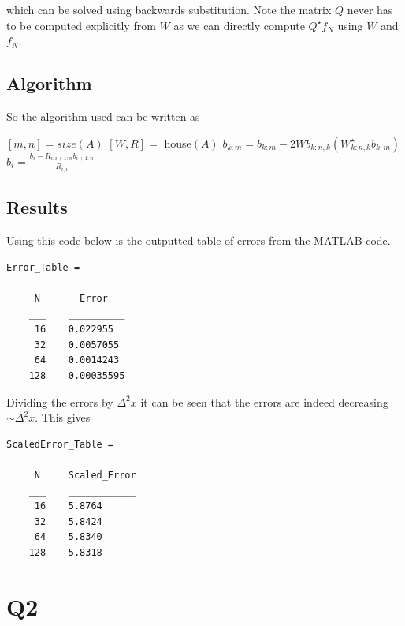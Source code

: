 \documentclass{article}
\begin{document}
which can be solved using backwards substitution. Note the matrix $Q$ never has to be computed explicitly from $W$ as we can directly compute $Q^\star f_N$ using $W$ and $f_N$.

\subsection{Algorithm}
So the algorithm used can be written as \\

\begin{algorithmic}
	\State $[m,n] = size(A)$ 
	\State $[W,R] =$ house$(A)$
	 
    	\State $b_{k:m} = b_{k:m} - 2 Wb_{k:n,k} ( W_{k:n,k}^\star b_{k:m} )$
	\EndFor
	 
   		\State $b_i = \frac{ b_i - R_{i,i+1:n} b_{i+1:n} }{ R_{i,i} }$
	\EndFor
\end{algorithmic}

\subsection{Results}
Using this code below is the outputted table of errors from the MATLAB code.

\begin{verbatim}
Error_Table = 

     N       Error   
    ___    __________
     16    0.022955
     32    0.0057055
     64    0.0014243
    128    0.00035595
\end{verbatim}

Dividing the errors by $\Delta^2 x$ it can be seen that the errors are indeed decreasing $\sim \Delta^2 x$. This gives

\begin{verbatim}
ScaledError_Table = 

     N     Scaled_Error
    ___    ____________
     16    5.8764      
     32    5.8424      
     64    5.8340      
    128    5.8318      

\end{verbatim}
\section{Q2}
\end{document}
